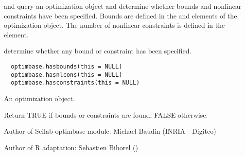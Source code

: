 %
\begin{Description}\relax
{} and  query an
optimization object and determine whether bounds and nonlinear constraints
have been specified. Bounds are defined in the  and
 elements of the optimization object. The number of
nonlinear constraints is defined in the  element.

 determine whether any bound or constraint
has been specified.
\end{Description}
%
\begin{Usage}
\begin{verbatim}
  optimbase.hasbounds(this = NULL)
  optimbase.hasnlcons(this = NULL)
  optimbase.hasconstraints(this = NULL)
\end{verbatim}
\end{Usage}
%
\begin{Arguments}
\begin{ldescription}
\item[\code{this}] An optimization object.
\end{ldescription}
\end{Arguments}
%
\begin{Value}
Return TRUE if bounds or constraints are found, FALSE otherwise.
\end{Value}
%
\begin{Author}\relax
Author of Scilab optimbase module: Michael Baudin (INRIA - Digiteo)

Author of R adaptation: Sebastien Bihorel ()
\end{Author}
